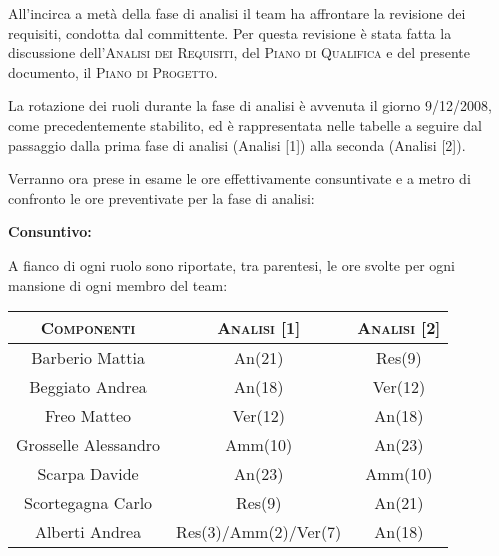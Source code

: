 \documentclass[11pt,a4paper]{article}
\begin{document}
All'incirca a metà della fase di analisi il team ha affrontare la revisione dei requisiti, condotta dal committente.
Per questa revisione è stata fatta la discussione dell'\textsc{Analisi dei Requisiti}, del \textsc{Piano di Qualifica} e del presente documento, il \textsc{Piano di Progetto}.

La rotazione dei ruoli durante la fase di analisi è avvenuta il giorno 9/12/2008, come precedentemente stabilito, ed è rappresentata nelle tabelle a seguire dal passaggio dalla prima fase di analisi (Analisi [1]) alla seconda (Analisi [2]).

Verranno ora prese in esame le ore effettivamente consuntivate e a metro di confronto le ore preventivate per la fase di analisi:

\bigskip \bigskip
\begin{large}\textbf{Consuntivo:}\end{large}
\newline
A fianco di ogni ruolo sono riportate, tra parentesi, le ore svolte per ogni mansione di ogni membro del team:
\\
\begin{center}
\begin{tabular}{|c||c|c|}
\hline
\textsc{Componenti} & \textsc{Analisi [1]} & \textsc{Analisi [2]} \\ \hline \hline
Barberio Mattia & An(21) & Res(9) \\ \hline
Beggiato Andrea & An(18) & Ver(12) \\ \hline
Freo Matteo & Ver(12) & An(18) \\ \hline
Grosselle Alessandro & Amm(10) & An(23) \\ \hline
Scarpa Davide & An(23) & Amm(10) \\ \hline
Scortegagna Carlo & Res(9) & An(21) \\ \hline
Alberti Andrea & Res(3)/Amm(2)/Ver(7) & An(18) \\ \hline
\end{tabular}
\end{center}
\end{document}
